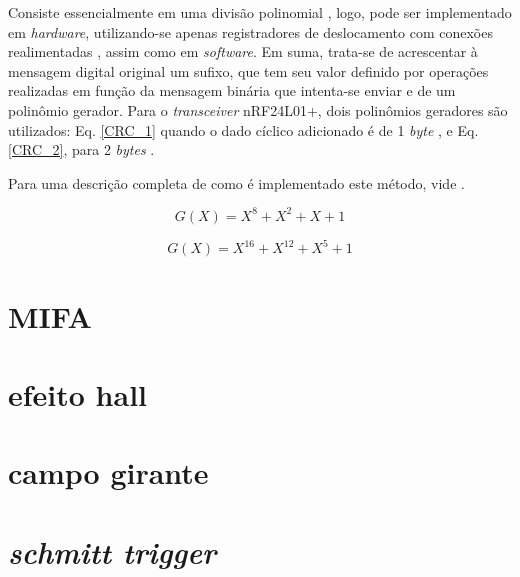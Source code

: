 Consiste essencialmente em uma divisão polinomial \cite{stigge}, logo, pode ser implementado em \textit{hardware}, utilizando-se apenas registradores 
de deslocamento com conexões realimentadas \cite{peterson}, assim como em \textit{software}. 
Em suma, trata-se de acrescentar à mensagem digital original um sufixo, que tem seu valor definido por operações realizadas em função da mensagem 
binária que intenta-se enviar e de um polinômio gerador.
Para o \textit{transceiver} nRF24L01+, dois polinômios geradores são utilizados: Eq. \ref{CRC_1} quando o dado cíclico adicionado é de 1 
\textit{byte} , e Eq. \ref{CRC_2}, para 2 \textit{bytes} \cite{nRF}.

Para uma descrição completa de como é implementado este método, vide \cite{stigge,peterson}.

\begin{equation}
\label{CRC_1}
G(X) = X^8 + X^2 + X + 1 
\end{equation}

\begin{equation}
\label{CRC_2}
G(X) = X^{16} + X^{12} + X^5 + 1 
\end{equation}

\section{MIFA} %

\section{efeito hall} %

\section{campo girante}

\section{\textit{schmitt trigger}}

